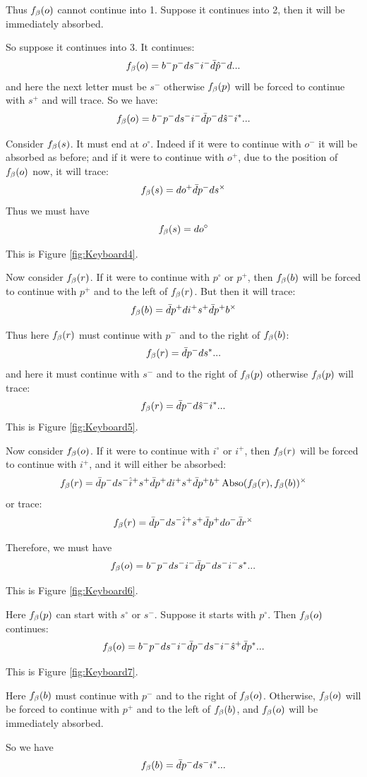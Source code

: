 Thus $f_\beta(o)$ cannot continue into 1. Suppose it continues into 2, then it will be immediately absorbed.

So suppose it continues into 3. It continues:
\[
f_\beta(o) = b^- p^- d s^- i^- \bar{d} \hat{p}^- d...
\]
and here the next letter must be $s^-$ otherwise $f_\beta(p)$ will be forced to continue with $s^+$ and will trace. So we have:
\[
f_\beta(o) = b^- p^- d s^- i^- \bar{d} p^- d \hat{s}^- i^*...
\]

Consider $f_\beta(s)$. It must end at $o^\circ$. Indeed if it were to continue with $o^-$ it will be absorbed as before; and if it were to continue with $o^+$, due to the position of $f_\beta(o)$ now, it will trace:
\[
f_\beta(s) = d o^+ \bar{d} p^- d s^\times
\]
Thus we must have
\[
f_\beta(s) = d o^\circ
\]

This is Figure \ref{fig:Keyboard4}.

Now consider $f_\beta(r)$. If it were to continue with $p^\circ$ or $p^+$, then $f_\beta(b)$ will be forced to continue with $p^+$ and to the left of $f_\beta(r)$. But then it will trace:
\[
f_\beta(b) = \bar{d} p^+ d i^+ s^+ \bar{d} p^+ b^\times
\]

Thus here $f_\beta(r)$ must continue with $p^-$ and to the right of $f_\beta(b)$:
\[
f_\beta(r) = \bar{d} p^- d s^*...
\]
and here it must continue with $s^-$ and to the right of $f_\beta(p)$ otherwise $f_\beta(p)$ will trace:
\[
f_\beta(r) = \bar{d} p^- d \hat{s}^- i^*...
\]
This is Figure \ref{fig:Keyboard5}.

Now consider $f_\beta(o)$. If it were to continue with $i^\circ$ or $i^+$, then $f_\beta(r)$ will be forced to continue with $i^+$, and it will either be absorbed:
\[
f_\beta(r) = \bar{d} p^- d s^- \hat{i}^+ s^+ \bar{d} p^+ d i^+ s^+ \bar{d} p^+ b^+ \operatorname{Abso}(f_\beta(r), f_\beta(b))^\times
\]
or trace:
\[
f_\beta(r) = \bar{d} p^- d s^- \hat{i}^+ s^+ \bar{d} p^+ d o^- \bar{d} r^\times
\]

Therefore, we must have
\[
f_\beta(o) = b^- p^- d s^- i^- \bar{d} p^- d s^- i^- s^*...
\]

This is Figure \ref{fig:Keyboard6}.

Here $f_\beta(p)$ can start with $s^\circ$ or $s^-$. Suppose it starts with $p^\circ$. Then $f_\beta(o)$ continues:
\[
f_\beta(o) = b^- p^- d s^- i^- \bar{d} p^- d s^- i^- \hat{s}^+ \bar{d} p^*...
\]

This is Figure \ref{fig:Keyboard7}.

Here $f_\beta(b)$ must continue with $p^-$ and to the right of $f_\beta(o)$. Otherwise, $f_\beta(o)$ will be forced to continue with $p^+$ and to the left of $f_\beta(b)$, and $f_\beta(o)$ will be immediately absorbed.

So we have
\[
f_\beta(b) = \bar{d} p^- d s^- i^*...
\]

